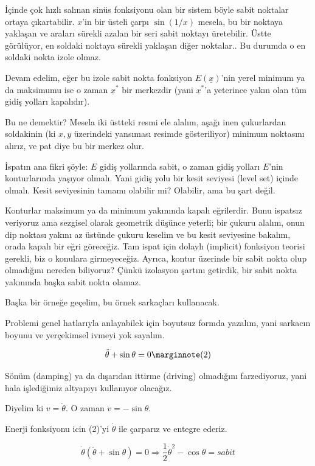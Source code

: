 \documentclass[12pt,fleqn]{article}\usepackage{../../common}
\begin{document}
İçinde çok hızlı salınan sinüs fonksiyonu olan bir sistem böyle sabit noktalar
ortaya çıkartabilir. $x$'in bir üsteli çarpı $\sin(1/x)$ mesela, bu bir noktaya
yaklaşan ve araları sürekli azalan bir seri sabit noktayı üretebilir. Üstte
görülüyor, en soldaki noktaya sürekli yaklaşan diğer noktalar.. Bu durumda o en
soldaki nokta izole olmaz.

Devam edelim, eğer bu izole sabit nokta fonksiyon $E(\underline{x})$'nin yerel
minimum ya da maksimumu ise o zaman $\underline{x}^*$ bir merkezdir (yani
$\underline{x}^*$'a yeterince yakın olan tüm gidiş yolları kapalıdır). 

Bu ne demektir? Mesela iki üstteki resmi ele alalım, aşağı inen çukurlardan
soldakinin (ki $x,y$ üzerindeki yansıması resimde gösteriliyor) minimum
noktasını alırız, ve pat diye bu bir merkez olur.

İspatın ana fikri şöyle: $E$ gidiş yollarında sabit, o zaman gidiş yolları
$E$'nin konturlarında yaşıyor olmalı. Yani gidiş yolu bir kesit seviyesi (level
set) içinde olmalı. Kesit seviyesinin tamamı olabilir mi? Olabilir, ama bu şart
değil.

Konturlar maksimum ya da minimum yakınında kapalı eğrilerdir. Bunu ispatsız
veriyoruz ama sezgisel olarak geometrik düşünce yeterli; bir çukuru alalım, onun
dip noktası yakını az üstünde çukuru keselim ve bu kesit seviyesine bakalım,
orada kapalı bir eğri göreceğiz. Tam ispat için dolaylı (implicit) fonksiyon
teorisi gerekli, biz o konulara girmeyeceğiz. Ayrıca, kontur üzerinde bir sabit
nokta olup olmadığını nereden biliyoruz? Çünkü izolasyon şartını getirdik, bir
sabit nokta yakınında başka sabit nokta olamaz. 

Başka bir örneğe geçelim, bu örnek sarkaçları kullanacak.

Problemi genel hatlarıyla anlayabilek için boyutsuz formda yazalım, yani
sarkacın boyunu ve yerçekimsel ivmeyi yok sayalım.

$$ \ddot{\theta} + \sin\theta = 0 
\mlabel{2} $$

Sönüm (damping) ya da dışarıdan ittirme (driving) olmadığını farzediyoruz, yani
hala işlediğimiz altyapıyı kullanıyor olacağız.

Diyelim ki $v = \dot{\theta}$. O zaman $\dot{v} = -\sin\theta$. 

Enerji fonksiyonu icin (2)'yi $\dot{\theta}$ ile çarparız ve entegre ederiz. 

$$ \dot{\theta}(\ddot{\theta} + \sin\theta) = 0 \Rightarrow
\frac{1}{2} \dot{\theta}^2 - \cos\theta = sabit
$$
\end{document}

